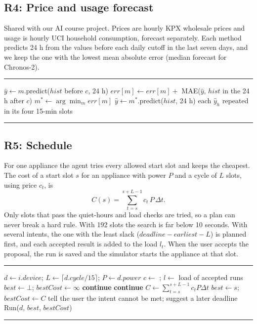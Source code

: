 \documentclass[conference,a4paper]{IEEEtran}
\newenvironment{pseudo}
  {\par\vspace{2pt}\noindent\begin{minipage}{\columnwidth}\hrule\vspace{2pt}\footnotesize\begin{algorithmic}[1]}
  {\end{algorithmic}\vspace{1pt}\hrule\end{minipage}\par\vspace{3pt}}
\begin{document}
\subsection{R4: Price and usage forecast}
Shared with our AI course project. Prices are hourly KPX wholesale prices and usage is hourly UCI household consumption, forecast separately. Each method predicts 24 h from the values before each daily cutoff in the last seven days, and we keep the one with the lowest mean absolute error (median forecast for Chronos-2).
\begin{pseudo}
 
    \State $\hat{y} \gets m$.predict($hist$ before $c$, 24 h)
    \State $err[m] \gets err[m] +$ MAE($\hat{y}$, $hist$ in the 24 h after $c$)
  \EndFor
\EndFor
\State $m^* \gets \arg\min_m err[m]$
\State $\hat{y} \gets m^*$.predict($hist$, 24 h)
\State \Return each $\hat{y}_h$ repeated in its four 15-min slots
\EndProcedure
\end{pseudo}

\subsection{R5: Schedule}
For one appliance the agent tries every allowed start slot and keeps the cheapest. The cost of a start slot $s$ for an appliance with power $P$ and a cycle of $L$ slots, using price $c_t$, is
\begin{equation}
C(s) = \sum_{t=s}^{s+L-1} c_t \, P \, \Delta t .
\end{equation}
Only slots that pass the quiet-hours and load checks are tried, so a plan can never break a hard rule. With 192 slots the search is far below 10 seconds. With several intents, the one with the least slack ($deadline - earliest - L$) is planned first, and each accepted result is added to the load $l_t$. When the user accepts the proposal, the run is saved and the simulator starts the appliance at that slot.
\begin{pseudo}
\State $d \gets i.device$; $L \gets \lceil d.cycle/15 \rceil$; $P \gets d.power$
\State $c \gets$ ; $l \gets$ load of accepted runs
\State $best \gets \bot$; $bestCost \gets \infty$
    \State \textbf{continue}
  \EndIf
    \State \textbf{continue}
  \EndIf
  \State $C \gets \sum_{t=s}^{s+L-1} c_t P \Delta t$
    \State $best \gets s$; $bestCost \gets C$
  \EndIf
\EndFor
{}
  \State tell the user the intent cannot be met; suggest a later deadline
  \State \Return
\EndIf
\State \Return Run($d$, $best$, $bestCost$) 
\EndProcedure
\end{pseudo}
\end{document}
